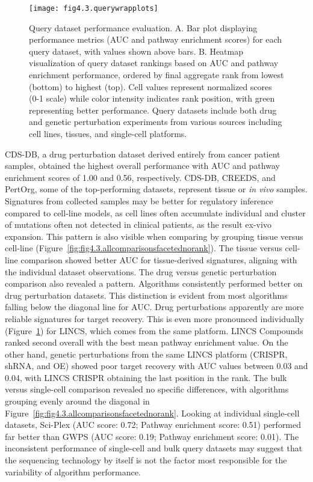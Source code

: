 \begin{figure}[htbp]
    \centering
    \texttt{[image: fig4.3.querywrapplots]}
    \caption[Query dataset performance evaluation.]{Query dataset performance evaluation. A. Bar plot displaying performance metrics (\gls{AUC} and pathway enrichment scores) for each query dataset, with values shown above bars. B. Heatmap visualization of query dataset rankings based on AUC and pathway enrichment performance, ordered by final aggregate rank from lowest (bottom) to highest (top). Cell values represent normalized scores (0-1 scale) while color intensity indicates rank position, with green representing better performance. Query datasets include both drug and genetic perturbation experiments from various sources including cell lines, tissues, and single-cell platforms.}
    \label{fig:fig4.3.querywrapplots}
\end{figure}

\gls{CDS-DB}, a drug perturbation dataset derived entirely from cancer patient samples, obtained the highest overall performance with \gls{AUC} and pathway enrichment scores of 1.00 and 0.56, respectively. \gls{CDS-DB}, \gls{CREEDS}, and PertOrg, some of the top-performing datasets, represent tissue or \textit{in vivo} samples.
Signatures from collected samples may be better for regulatory inference compared to cell-line models, as cell lines often accumulate individual and cluster of mutations often not detected in clinical patients, as the result ex-vivo expansion.
This pattern is also visible when comparing by grouping tissue versus cell-line (Figure~\ref{fig:fig4.3.allcomparisonsfacetednorank}).
The tissue versus cell-line comparison showed better \gls{AUC} for tissue-derived signatures, aligning with the individual dataset observations.
The drug versus genetic perturbation comparison also revealed a pattern.
Algorithms consistently performed better on drug perturbation datasets.
This distinction is evident from most algorithms falling below the diagonal line for \gls{AUC}.
Drug perturbations apparently are more reliable signatures for target recovery.
This is even more pronounced individually (Figure~\ref{fig:fig4.3.querywrapplots}) for \gls{LINCS}, which comes from the same platform. \gls{LINCS} Compounds ranked second overall with the best mean pathway enrichment value.
On the other hand, genetic perturbations from the same \gls{LINCS} platform (\gls{CRISPR}, shRNA, and \gls{OE}) showed poor target recovery with \gls{AUC} values between 0.03 and 0.04, with \gls{LINCS} \gls{CRISPR} obtaining the last position in the rank. 
The bulk versus single-cell comparison revealed no specific differences, with algorithms grouping evenly around the diagonal in Figure~\ref{fig:fig4.3.allcomparisonsfacetednorank}.
Looking at individual single-cell datasets, Sci-Plex (\gls{AUC} score: 0.72; Pathway enrichment score: 0.51) performed far better than \gls{GWPS} (\gls{AUC} score: 0.19; Pathway enrichment score: 0.01).
The inconsistent performance of single-cell and bulk query datasets may suggest that the sequencing technology by itself is not the factor most responsible for the variability of algorithm performance.

